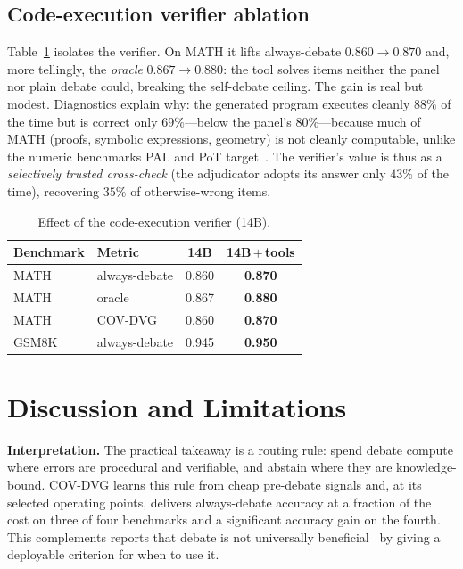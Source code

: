 \documentclass[conference]{IEEEtran}
\begin{document}
\subsection{Code-execution verifier ablation}
Table~\ref{tab:tools} isolates the verifier. On MATH it lifts always-debate
$0.860\!\rightarrow\!0.870$ and, more tellingly, the \emph{oracle}
$0.867\!\rightarrow\!0.880$: the tool solves items neither the panel nor plain debate
could, breaking the self-debate ceiling. The gain is real but modest. Diagnostics
explain why: the generated program executes cleanly $88\%$ of the time but is correct
only $69\%$---below the panel's $80\%$---because much of MATH (proofs, symbolic
expressions, geometry) is not cleanly computable, unlike the numeric benchmarks PAL and
PoT target~\cite{gao2023pal,chen2023pot}. The verifier's value is thus as a
\emph{selectively trusted cross-check} (the adjudicator adopts its answer only $43\%$
of the time), recovering $35\%$ of otherwise-wrong items.

\begin{table}[!t]
\caption{Effect of the code-execution verifier (14B).}
\label{tab:tools}
\centering
\begin{tabular}{llcc}
\toprule
Benchmark & Metric & 14B & 14B\,$+$\,tools \\
\midrule
MATH  & always-debate & 0.860 & \textbf{0.870} \\
MATH  & oracle        & 0.867 & \textbf{0.880} \\
MATH  & COV-DVG       & 0.860 & \textbf{0.870} \\
GSM8K & always-debate & 0.945 & \textbf{0.950} \\
\bottomrule
\end{tabular}
\end{table}

\section{Discussion and Limitations}
\textbf{Interpretation.} The practical takeaway is a routing rule: spend debate compute
where errors are procedural and verifiable, and abstain where they are knowledge-bound.
COV-DVG learns this rule from cheap pre-debate signals and, at its selected operating
points, delivers always-debate accuracy at a fraction of the cost on three of four
benchmarks and a significant accuracy gain on the fourth. This complements reports that
debate is not universally beneficial~\cite{wynn2025failure} by giving a deployable
criterion for when to use it.
\end{document}
